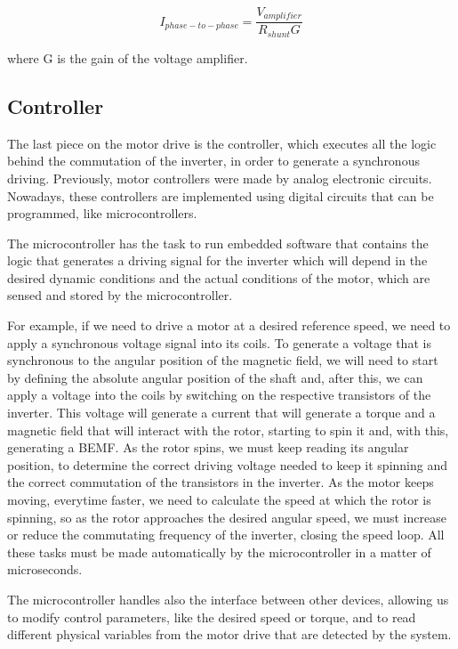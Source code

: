 \begin{equation}\label{ohm_shunt}
	I_{phase-to-phase} = \frac{V_{amplifier}}{R_{shunt}G}
\end{equation}

where G is the gain of the voltage amplifier.

\subsection{Controller}

The last piece on the motor drive is the controller, which executes all the logic behind the commutation of the inverter, in order to generate a synchronous driving. Previously, motor controllers were made by analog electronic circuits. Nowadays, these controllers are implemented using digital circuits that can be programmed, like microcontrollers.

The microcontroller has the task to run embedded software that contains the logic that generates a driving signal for the inverter which will depend in the desired dynamic conditions and the actual conditions of the motor, which are sensed and stored by the microcontroller.

For example, if we need to drive a motor at a desired reference speed, we need to apply a synchronous voltage signal into its coils. To generate a voltage that is synchronous to the angular position of the magnetic field, we will need to start by defining the absolute angular position of the shaft and, after this, we can apply a voltage into the coils by switching on the respective transistors of the inverter. This voltage will generate a current that will generate a torque and a magnetic field that will interact with the rotor, starting to spin it and, with this, generating a \ac{BEMF}. As the rotor spins, we must keep reading its angular position, to determine the correct driving voltage needed to keep it spinning and the correct commutation of the transistors in the inverter. As the motor keeps moving, everytime faster, we need to calculate the speed at which the rotor is spinning, so as the rotor approaches the desired angular speed, we must increase or reduce the commutating frequency of the inverter, closing the speed loop. All these tasks must be made automatically by the microcontroller in a matter of microseconds.

The microcontroller handles also the interface between other devices, allowing us to modify control parameters, like the desired speed or torque, and to read different physical variables from the motor drive that are detected by the system.

